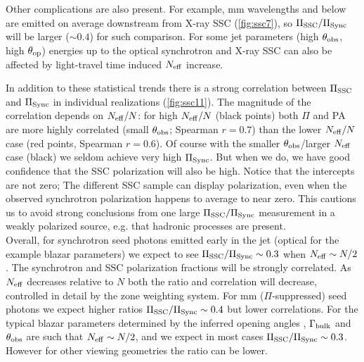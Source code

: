 Other complications are also present. For example, mm wavelengths and below are emitted on average downstream from X-ray SSC (\cref{fig:ssc7}), so $\Pi_{\rm SSC} / \Pi_{\rm Sync}$ will be larger ($\sim 0.4$) for such comparison. For some jet parameters (high $\theta_{\rm obs}$, high $\theta_{\rm op}$) energies up to the optical synchrotron and X-ray SSC can also be affected by light-travel time induced $N_{\rm eff}$ increase. 

In addition to these statistical trends there is a strong correlation between $\Pi_{\rm SSC}$ and $\Pi_{\rm Sync}$ in individual realizations (\cref{fig:ssc11}). The magnitude of the correlation depends on $N_{\rm eff}/N$: for high $N_{\rm eff}/N$ (black points) both $\Pi$ and PA are more highly correlated (small $\theta_{\rm obs}$; Spearman $r=0.7$) than the lower $N_{\rm eff}/N$ case (red points, Spearman $r=0.6$). Of course with the smaller $\theta_{\rm obs}$/larger $N_{\rm eff}$ case (black) we seldom achieve very high $\Pi_{\rm Sync}$. But when we do, we have good confidence that the SSC polarization will also be high. Notice that the intercepts are not zero; The different SSC sample can display polarization, even when the observed synchrotron polarization happens to average to near zero. This cautions us to avoid strong conclusions from one large $\Pi_{\rm SSC}/\Pi_{\rm Sync}$ measurement in a weakly polarized source, e.g. that hadronic processes are present.\\

Overall, for synchrotron seed photons emitted early in the jet (optical for the example blazar parameters) we expect to see $\Pi_{\rm SSC}/\Pi_{\rm Sync} \sim 0.3$ when $N_{\rm eff} \sim N/2$. The synchrotron and SSC polarization fractions will be strongly correlated. As $N_{\rm eff}$ decreases relative to $N$ both the ratio and correlation will decrease, controlled in detail by the zone weighting system. For mm ($\Pi$-suppressed) seed photons we expect higher ratios $\Pi_{\rm SSC}/\Pi_{\rm Sync} \sim 0.4$ but lower correlations. For the typical blazar parameters determined by the inferred opening angles \citep{clausen-brown_causal_2013, jorstad_kinematics_2017}, $\Gamma_{\rm bulk}$ and $\theta_{\rm obs}$ are such that $N_{\rm eff} \sim N/2$, and we expect in most cases $\Pi_{\rm SSC}/\Pi_{\rm Sync} \sim 0.3$. However for other viewing geometries the ratio can be lower. 

